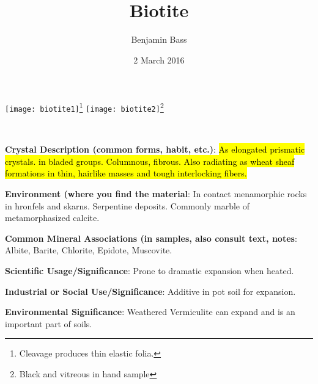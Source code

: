\documentclass[10pt]{article}
\author{Benjamin Bass}
\date{2 March 2016}
\title{\vspace{-2.0cm}Biotite} %
\begin{document}
\maketitle


\begin{center}
  \texttt{[image: biotite1]}\footnote{Cleavage produces thin elastic folia.}
  \texttt{[image: biotite2]}\footnote{Black and vitreous in hand sample}
\end{center}



\
\
\
\
\
\
\
\
\
\

\begin{framed}
  \textbf{Crystal Description (common forms, habit, etc.)}: \hl{As elongated prismatic crystals. in bladed groups. Columnous, fibrous. Also radiating as wheat sheaf formations in thin, hairlike masses and tough interlocking fibers.}
\end{framed}

\begin{framed}
  \textbf{Environment (where you find the material}: In contact menamorphic rocks in hronfels and skarns. Serpentine deposits. Commonly marble of metamorphasized calcite.
\end{framed}

\begin{framed}
  \textbf{Common Mineral Associations (in samples, also consult text, notes}: Albite, Barite, Chlorite, Epidote, Muscovite.
\end{framed}

\begin{framed}
  \textbf{Scientific Usage/Significance}: Prone to dramatic expansion when heated.
\end{framed}

\begin{framed}
  \textbf{Industrial or Social Use/Significance}: Additive in pot soil for expansion.
\end{framed}

\begin{framed}
  \textbf{Environmental Significance}: Weathered Vermiculite can expand and is an important part of soils.
\end{framed}

\end{document}
